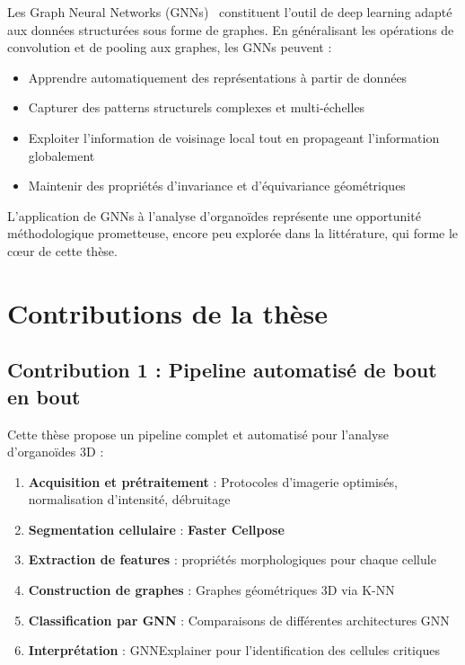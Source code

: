 Les Graph Neural Networks (GNNs)~\cite{Wu2021,Zhou2020,Battaglia2018} constituent l'outil de deep learning adapté aux données structurées sous forme de graphes. En généralisant les opérations de convolution et de pooling aux graphes, les GNNs peuvent :
\begin{itemize}
    \item Apprendre automatiquement des représentations à partir de données
    \item Capturer des patterns structurels complexes et multi-échelles
    \item Exploiter l'information de voisinage local tout en propageant l'information globalement
    \item Maintenir des propriétés d'invariance et d'équivariance géométriques
\end{itemize}

L'application de GNNs à l'analyse d'organoïdes représente une opportunité méthodologique prometteuse, encore peu explorée dans la littérature, qui forme le cœur de cette thèse.

\section{Contributions de la thèse}

\subsection{Contribution 1 : Pipeline automatisé de bout en bout}

Cette thèse propose un pipeline complet et automatisé pour l'analyse d'organoïdes 3D :

\begin{enumerate}
    \item \textbf{Acquisition et prétraitement} : Protocoles d'imagerie optimisés, normalisation d'intensité, débruitage
    \item \textbf{Segmentation cellulaire} : \textbf{Faster Cellpose} 
    \item \textbf{Extraction de features} : propriétés morphologiques pour chaque cellule
    \item \textbf{Construction de graphes} : Graphes géométriques 3D via K-NN
    \item \textbf{Classification par GNN} : Comparaisons de différentes architectures GNN
    \item \textbf{Interprétation} : GNNExplainer pour l'identification des cellules critiques
\end{enumerate}

